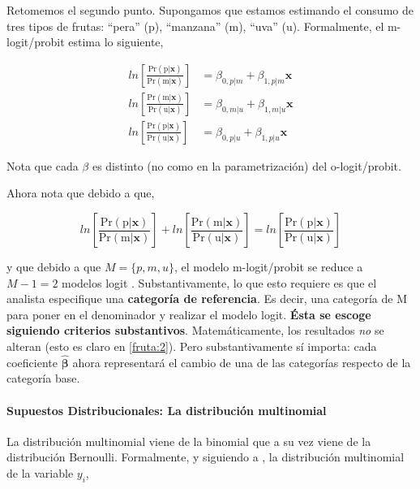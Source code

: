 \documentclass[onesided]{article}\usepackage[]{graphicx}\usepackage[]{color}
\begin{document}
Retomemos el segundo punto. Supongamos que estamos estimando el consumo de tres tipos de frutas: ``pera'' (p), ``manzana'' (m), ``uva'' (u). Formalmente, el m-logit/probit estima lo siguiente,

\begin{equation}\label{fruta}
\begin{split}
ln[\frac{\text{Pr}(\text{p}|\boldsymbol{x})}{\text{Pr}(\text{m}|\boldsymbol{x})}] & = \beta_{0, p|m} + \beta_{1, p|m}\boldsymbol{x}\\
ln[\frac{\text{Pr}(\text{m}|\boldsymbol{x})}{\text{Pr}(\text{u}|\boldsymbol{x})}] & = \beta_{0, m|u} + \beta_{1, m|u}\boldsymbol{x}\\
ln[\frac{\text{Pr}(\text{p}|\boldsymbol{x})}{\text{Pr}(\text{u}|\boldsymbol{x})}] & = \beta_{0, p|u} + \beta_{1, p|u}\boldsymbol{x}
\end{split}
\end{equation}

Nota que cada $\beta$ es distinto (no como en la parametrizaci\'on) del o-logit/probit.

Ahora nota que debido a que,

\begin{equation}\label{fruta:2}
ln[\frac{\text{Pr}(\text{p}|\boldsymbol{x})}{\text{Pr}(\text{m}|\boldsymbol{x})}] +  ln[\frac{\text{Pr}(\text{m}|\boldsymbol{x})}{\text{Pr}(\text{u}|\boldsymbol{x})}] = ln[\frac{\text{Pr}(\text{p}|\boldsymbol{x})}{\text{Pr}(\text{u}|\boldsymbol{x})}]
\end{equation}

y que debido a que $M=\{p,m,u \}$, el modelo m-logit/probit se reduce a $M-1=2$ modelos logit \parencite[163]{Ward2018}. Substantivamente, lo que esto requiere es que el analista especifique una {\bf categor\'ia de referencia}. Es decir, una categor\'ia de M para poner en el denominador y realizar el modelo logit. {\bf \'Esta se escoge siguiendo criterios substantivos}. Matem\'aticamente, los resultados \emph{no} se alteran (esto es claro en \autoref{fruta:2}). Pero substantivamente s\'i importa: cada coeficiente $\boldsymbol{\hat\beta}$ ahora representar\'a el cambio de una de las categor\'ias respecto de la categor\'ia base. 


\paragraph{Supuestos Distribucionales: La distribuci\'on multinomial} 

La distribuci\'on multinomial viene de la binomial que a su vez viene de la distribuci\'on Bernoulli. Formalmente, y siguiendo a \textcite[162]{Ward2018}, la distribuci\'on multinomial de la variable $y_{i}$,
\end{document}
